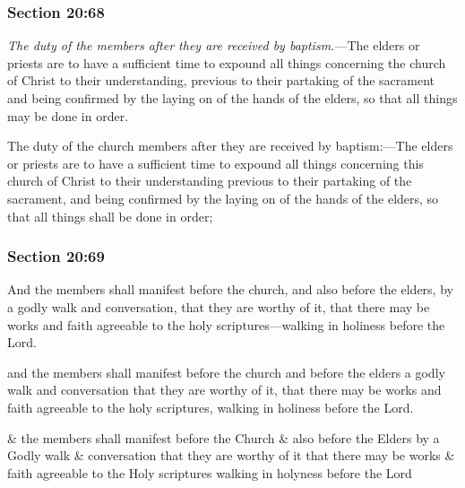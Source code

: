 	\subsubsection{Section 20:68} %
		\label{DC20-68}

		\textit{The duty of the members after they are received by baptism.}---The elders or priests are to have a sufficient time to expound all things concerning the church of Christ to their understanding, previous to their partaking of the sacrament and being confirmed by the laying on of the hands of the elders, so that all things may be done in order.

		\begin{framed}
		\scriptsize
			\begin{compactdesc}
				\item[JSP] The duty of the church members after they are received by baptism:---The elders or priests are to have a sufficient time to expound all things concerning this church of Christ to their understanding previous to their partaking of the sacrament, and being confirmed by the laying on of the hands of the elders, so that all things shall be done in order; 
				\item[RB1] 
				\item[BC] 
			\end{compactdesc}
		\end{framed}

	\subsubsection{Section 20:69} %
		\label{DC20-69}

		And the members shall manifest before the church, and also before the elders, by a godly walk and conversation, that they are worthy of it, that there may be works and faith agreeable to the holy scriptures---walking in holiness before the Lord.

		\begin{framed}
		\scriptsize
			\begin{compactdesc}
				\item[JSP] and the members shall manifest before the church and before the elders a godly walk and conversation that they are worthy of it, that there may be works and faith agreeable to the holy scriptures, walking in holiness before the Lord. 
				\item[RB1] \& the members shall manifest before the Church \& also before the Elders by a Godly walk \& conversation that they are worthy of it that there may be works \& faith agreeable to the Holy scriptures walking in holyness before the Lord
			\end{compactdesc}
		\end{framed}

